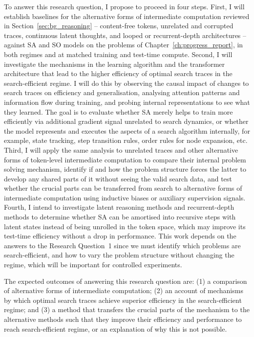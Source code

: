To answer this research question, I propose to proceed in four steps.
First, I will establish baselines for the alternative forms of intermediate computation reviewed in Section~\ref{sec:bg_reasoning} -- content-free tokens, unrelated and corrupted traces, continuous latent thoughts, and looped or recurrent-depth architectures -- against SA and SO models on the problems of Chapter~\ref{ch:progress_report}, in both regimes and at matched training and test-time compute.
Second, I will investigate the mechanisms in the learning algorithm and the transformer architecture that lead to the higher efficiency of optimal search traces in the search-efficient regime.
I will do this by observing the causal impact of changes to search traces on efficiency and generalisation, analysing attention patterns and information flow during training, and probing internal representations to see what they learned.
The goal is to evaluate whether SA merely helps to train more efficiently via additional gradient signal unrelated to search dynamics, or whether the model represents and executes the aspects of a search algorithm internally, for example, state tracking, step transition rules, order rules for node expansion, etc.
Third, I will apply the same analysis to unrelated traces and other alternative forms of token-level intermediate computation to compare their internal problem solving mechanism, identify if and how the problem structure forces the latter to develop any shared parts of it without seeing the valid search data, and test whether the crucial parts can be transferred from search to alternative forms of intermediate computation using inductive biases or auxiliary supervision signals.
Fourth, I intend to investigate latent reasoning methods and recurrent-depth methods to determine whether SA can be amortised into recursive steps with latent states instead of being unrolled in the token space, which may improve its test-time efficiency without a drop in performance.
This work depends on the answers to the Research Question~1 since we must identify which problems are search-efficient, and how to vary the problem structure without changing the regime, which will be important for controlled experiments.

The expected outcomes of answering this research question are: (1) a comparison of alternative forms of intermediate computation; (2) an account of mechanisms by which optimal search traces achieve superior efficiency in the search-efficient regime; and (3) a method that transfers the crucial parts of the mechanism to the alternative methods such that they improve their efficiency and performance to reach search-efficient regime, or an explanation of why this is not possible.

